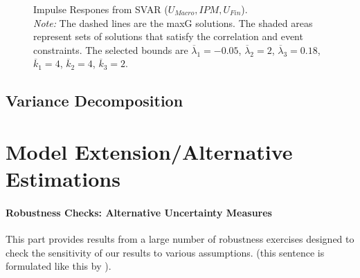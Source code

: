 \documentclass[a4paper,11pt,listof=nochaptergap,oneside,pointednumbers,bibtotoc,bigheadings,liststotoc]{scrbook}
\theoremstyle{mysatz}
\theoremstyle{mydefinition}
\theoremstyle{mybemerkung}
\renewcommand*{\paragraph}[1]{\subsubsection*{#1} \vspace{-3mm}} %
\begin{document}
\begin{figure}[!h]
   \centering
   \setlength\fboxsep{0pt}
   \setlength\fboxrule{0pt}
      \caption[Impulse Respones from SVAR ($U_{Macro}, IPM, U_{Fin}$).]{Impulse Respones from SVAR ($U_{Macro}, IPM, U_{Fin}$).\\
      \textit{Note:}  The dashed lines are the maxG solutions. The shaded areas represent sets of solutions that satisfy the correlation and event constraints. The selected bounds are $\overline{\lambda}_1 = -0.05$, $\overline{\lambda}_2 = 2$, $\overline{\lambda}_3 = 0.18$, $\overline{k}_1 = 4$, $\overline{k}_2 = 4$, $\overline{k}_3 = 2$.}   \label{fig:impulse.responses_all.SVAR}
\end{figure}

\section[Variance Decomposition]{Variance Decomposition}
\label{sec:VarianceDecomposition}


\chapter{Model Extension/Alternative Estimations}
\label{sec:ModelExtension}

\paragraph{Robustness Checks: Alternative Uncertainty Measures}
This part provides results from a large number of robustness exercises designed to check the sensitivity of our results to various assumptions. (this sentence is formulated like this by \citet{juradoetal:15}).
\end{document}
